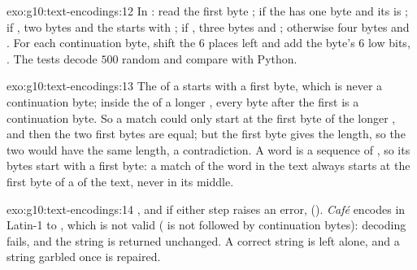 \begin{solution}{exo:g10:text-encodings:12}
In : read the first byte ; if  the  has one byte and
its  is ; if , two bytes and the  starts with ; if
, three bytes and ; otherwise four bytes and . For each
continuation byte, shift the  $6$ places left and add the byte's $6$ low bits, .
The tests decode $500$ random  and compare with Python.
\end{solution}

\begin{solution}{exo:g10:text-encodings:13}
The  of a  starts with a first byte, which is never a continuation byte; inside the  of a
longer , every byte after the first is a continuation byte. So a match could only start at the first byte of
the longer , and then the two first bytes are equal; but the first byte gives the length, so the two
 would have the same length, a contradiction. A word is a sequence of , so its bytes start with a
first byte: a match of the word in the text always starts at the first byte of a  of the text, never in its
middle.
\end{solution}

\begin{solution}{exo:g10:text-encodings:14}
, and if either step raises an error, 
(). \textit{Café} encodes in Latin-1 to , which is not valid 
( is not followed by continuation bytes): decoding fails, and the string is returned unchanged. A correct
string is left alone, and a string garbled once is repaired.
\end{solution}

